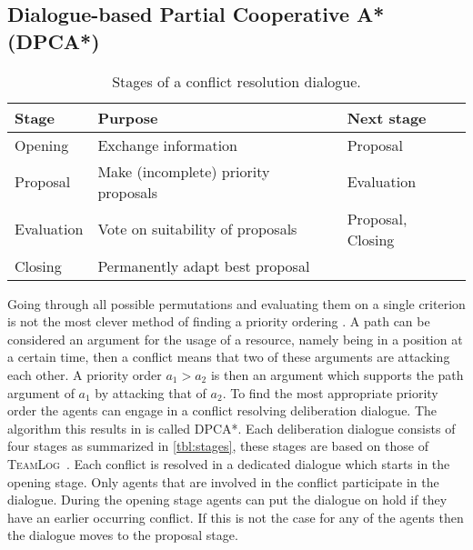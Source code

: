 \subsection{Dialogue-based Partial Cooperative A* (DPCA*)}
\begin{table}
    \centering
    \caption{Stages of a conflict resolution dialogue.}
    \label{tbl:stages}
    \begin{tabularx}{\columnwidth}{l|X|l}
        Stage & Purpose & Next stage \\ \hline
        Opening & Exchange information & Proposal \\
        Proposal & Make (incomplete) priority proposals & Evaluation \\
        Evaluation & Vote on suitability of proposals & Proposal, Closing \\
        Closing & Permanently adapt best proposal & \\
    \end{tabularx}
\end{table}

Going through all possible permutations and evaluating them on a single
criterion is not the most clever method of finding a priority ordering
\cite{bennewitz2002}. A path can be considered an argument for the usage of a 
resource, namely being in a position at a certain time, then a conflict means 
that two of these arguments are attacking each other. A priority order $a_1 > 
a_2$ is then an argument which supports the path argument of $a_1$ by attacking 
that of $a_2$. To find the most appropriate priority order the agents can 
engage in a conflict resolving deliberation dialogue. The algorithm this 
results in is called DPCA*. Each deliberation dialogue consists of four stages 
as summarized in \autoref{tbl:stages}, these stages are based on those of 
\textsc{TeamLog}~\cite{dunin-keplicz2011}. Each conflict is resolved in a 
dedicated dialogue which starts in the opening stage. Only agents that are 
involved in the conflict participate in the dialogue. During the opening stage 
agents can put the dialogue on hold if they have an earlier occurring conflict. 
If this is not the case for any of the agents then the dialogue moves to the 
proposal stage.

